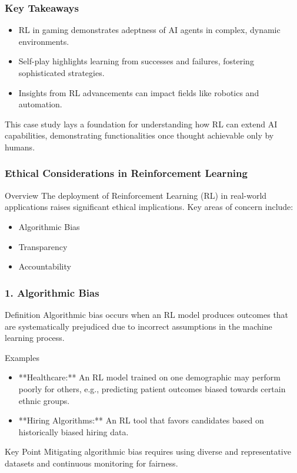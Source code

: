 \documentclass[aspectratio=169]{beamer}
\begin{document}
\begin{frame}[fragile]
    \frametitle{Key Takeaways}

    \begin{itemize}
        \item RL in gaming demonstrates adeptness of AI agents in complex, dynamic environments.
        \item Self-play highlights learning from successes and failures, fostering sophisticated strategies.
        \item Insights from RL advancements can impact fields like robotics and automation.
    \end{itemize}

    This case study lays a foundation for understanding how RL can extend AI capabilities, demonstrating functionalities once thought achievable only by humans.
    
\end{frame}

\begin{frame}[fragile]
    \frametitle{Ethical Considerations in Reinforcement Learning}
    \begin{block}{Overview}
        The deployment of Reinforcement Learning (RL) in real-world applications raises significant ethical implications. Key areas of concern include:
        \begin{itemize}
            \item Algorithmic Bias
            \item Transparency
            \item Accountability
        \end{itemize}
    \end{block}
\end{frame}

\begin{frame}[fragile]
    \frametitle{1. Algorithmic Bias}
    \begin{block}{Definition}
        Algorithmic bias occurs when an RL model produces outcomes that are systematically prejudiced due to incorrect assumptions in the machine learning process.
    \end{block}
    \begin{block}{Examples}
        \begin{itemize}
            \item **Healthcare:** An RL model trained on one demographic may perform poorly for others, e.g., predicting patient outcomes biased towards certain ethnic groups.
            \item **Hiring Algorithms:** An RL tool that favors candidates based on historically biased hiring data.
        \end{itemize}
    \end{block}
    \begin{block}{Key Point}
        Mitigating algorithmic bias requires using diverse and representative datasets and continuous monitoring for fairness.
    \end{block}
\end{frame}
\end{document}
